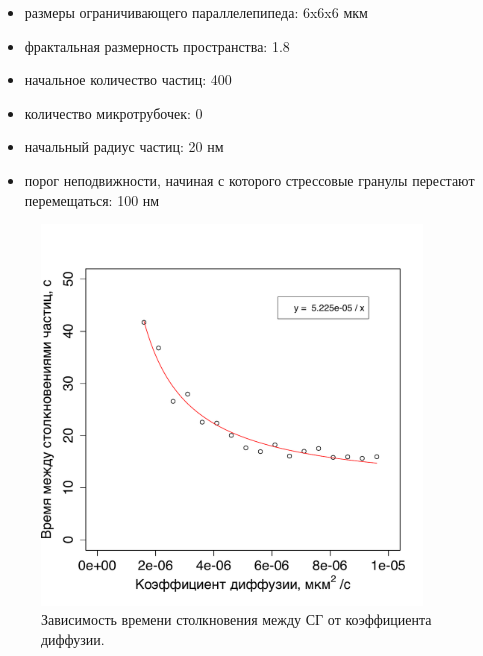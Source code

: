 \documentclass[14pt,a4paper]{extarticle}
\begin{document}
\begin{itemize}
	\item размеры ограничивающего параллелепипеда: 6x6x6 мкм
	\item фрактальная размерность пространства: 1.8
	\item начальное количество частиц: 400
	\item количество микротрубочек: 0
	\item начальный радиус частиц: 20 нм
	\item порог неподвижности, начиная с которого стрессовые гранулы перестают перемещаться: 100 нм
\end{itemize}

\begin{figure}[htbp]\centering
\includegraphics[width=0.9\textwidth]{../results/P2pCollisionTimeOnDiffusionExperiment.pdf}
\caption{Зависимость времени столкновения между СГ от коэффициента диффузии.}
\label{fig:P2pCollisionTimeOnDiffusionExperiment}
\end{figure}
\end{document}
